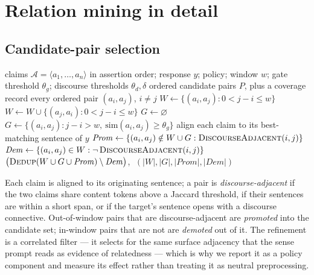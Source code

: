 \section{Relation mining in detail}
\label{app-mining}

\subsection{Candidate-pair selection}

\begin{algorithm}[t]
\caption{\textsc{SelectCandidatePairs}: response-anchored candidate selection.}
\label{alg-pairs}
\begin{algorithmic}[1]
\Require claims $\mathcal{A}=\langle a_1,\dots,a_n\rangle$ in assertion order; response $y$;
  policy; window $w$; gate threshold $\theta_g$; discourse thresholds $\theta_d,\delta$
\Ensure ordered candidate pairs $P$, plus a coverage record
 \Return every ordered pair $(a_i,a_j)$, $i\neq j$ \EndIf
\State $W \gets \{(a_i,a_j) : 0 < j-i \le w\}$ 
 $W \gets W \cup \{(a_j,a_i) : 0 < j-i \le w\}$ \EndIf
\State $G \gets \varnothing$
  \State $G \gets \{(a_i,a_j) : j-i > w,\ \mathrm{sim}(a_i,a_j)\ge\theta_g\}$
\EndIf
\State align each claim to its best-matching sentence of $y$
\State $\mathit{Prom} \gets \{(a_i,a_j)\notin W\cup G : \textsc{DiscourseAdjacent}(i,j)\}$
\State $\mathit{Dem} \gets \{(a_i,a_j)\in W : \neg\,\textsc{DiscourseAdjacent}(i,j)\}$
\State \Return $\bigl(\textsc{Dedup}(W \cup G \cup \mathit{Prom}) \setminus \mathit{Dem}\bigr)$,
  $\;(|W|,|G|,|\mathit{Prom}|,|\mathit{Dem}|)$
\end{algorithmic}
\end{algorithm}


Each claim is aligned to its originating sentence; a pair is \emph{discourse-adjacent} if the two
claims share content tokens above a Jaccard threshold, if their sentences are within a short span,
or if the target's sentence opens with a discourse connective. Out-of-window pairs that are
discourse-adjacent are \emph{promoted} into the candidate set; in-window pairs that are not are
\emph{demoted} out of it. The refinement is a correlated filter --- it selects for the same surface
adjacency that the sense prompt reads as evidence of relatedness --- which is why we report it as a
policy component and measure its effect rather than treating it as neutral preprocessing.

